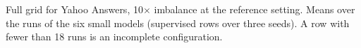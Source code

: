 \begin{table}[t]
  \centering
  \footnotesize
  
  \caption{Full grid for Yahoo Answers, 10$\times$ imbalance at the reference setting. Means over the runs of the six small models (supervised rows over three seeds). A row with fewer than 18 runs is an incomplete configuration.}
  \label{tab:grid_yahoo_imb10}
\end{table}
